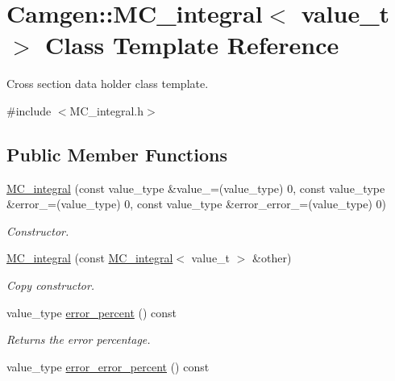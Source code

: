 \hypertarget{a00368}{}\section{Camgen\+:\+:M\+C\+\_\+integral$<$ value\+\_\+t $>$ Class Template Reference}
\label{a00368}


Cross section data holder class template.  




{\ttfamily \#include $<$M\+C\+\_\+integral.\+h$>$}

\subsection*{Public Member Functions}
\begin{DoxyCompactItemize}
\item 
\hypertarget{a00368_a8caa7a907d8e8d240c8c4f40f527b928}{}\hyperlink{a00368_a8caa7a907d8e8d240c8c4f40f527b928}{M\+C\+\_\+integral} (const value\+\_\+type \&value\+\_\+=(value\+\_\+type) 0, const value\+\_\+type \&error\+\_\+=(value\+\_\+type) 0, const value\+\_\+type \&error\+\_\+error\+\_\+=(value\+\_\+type) 0)\label{a00368_a8caa7a907d8e8d240c8c4f40f527b928}

\begin{DoxyCompactList}\small\item\em Constructor. \end{DoxyCompactList}\item 
\hypertarget{a00368_a514bc02671485104c893c760148316f9}{}\hyperlink{a00368_a514bc02671485104c893c760148316f9}{M\+C\+\_\+integral} (const \hyperlink{a00368}{M\+C\+\_\+integral}$<$ value\+\_\+t $>$ \&other)\label{a00368_a514bc02671485104c893c760148316f9}

\begin{DoxyCompactList}\small\item\em Copy constructor. \end{DoxyCompactList}\item 
\hypertarget{a00368_aa506af585c07d90efaf668433222640b}{}value\+\_\+type \hyperlink{a00368_aa506af585c07d90efaf668433222640b}{error\+\_\+percent} () const \label{a00368_aa506af585c07d90efaf668433222640b}

\begin{DoxyCompactList}\small\item\em Returns the error percentage. \end{DoxyCompactList}\item 
\hypertarget{a00368_a9c6b3b3e2be84b597431b9a36a3c37c6}{}value\+\_\+type \hyperlink{a00368_a9c6b3b3e2be84b597431b9a36a3c37c6}{error\+\_\+error\+\_\+percent} () const \label{a00368_a9c6b3b3e2be84b597431b9a36a3c37c6}


\end{DoxyCompactItemize}
